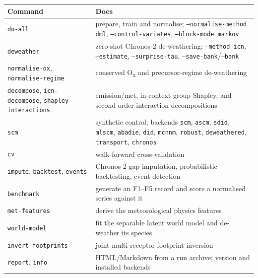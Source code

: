 \documentclass[11pt]{report}
\newcommand{\codeunderscore}{\textunderscore\allowbreak}
\newcommand{\code}[1]{\texttt{\let\_\codeunderscore #1}}
\begin{document}
\begin{center}\small
\begin{tabular}{@{}p{3.5cm}p{11.4cm}@{}}
\toprule
Command & Does \\
\midrule
\code{do-all} & prepare, train and normalise; \code{--normalise-method dml}, \code{--control-variates}, \code{--block-mode markov} \\
\code{deweather} & zero-shot Chronos-2 de-weathering; \code{--method icn}, \code{--estimate}, \code{--surprise-tau}, \code{--save-bank}/\code{--bank} \\
\code{normalise-ox}, \code{normalise-regime} & conserved O\textsubscript{x} and precursor-regime de-weathering \\
\code{decompose}, \code{icn-decompose}, \code{shapley-interactions} & emission/met, in-context group Shapley, and second-order interaction decompositions \\
\code{scm} & synthetic control; backends \code{scm}, \code{ascm}, \code{sdid}, \code{mlscm}, \code{abadie}, \code{did}, \code{mcnnm}, \code{robust}, \code{deweathered}, \code{transport}, \code{chronos} \\
\code{cv} & walk-forward cross-validation \\
\code{impute}, \code{backtest}, \code{events} & Chronos-2 gap imputation, probabilistic backtesting, event detection \\
\code{benchmark} & generate an F1--F5 record and score a normalised series against it \\
\code{met-features} & derive the meteorological physics features \\
\code{world-model} & fit the separable latent world model and de-weather its species \\
\code{invert-footprints} & joint multi-receptor footprint inversion \\
\code{report}, \code{info} & HTML/Markdown from a run archive; version and installed backends \\
\bottomrule
\end{tabular}
\end{center}
\end{document}
